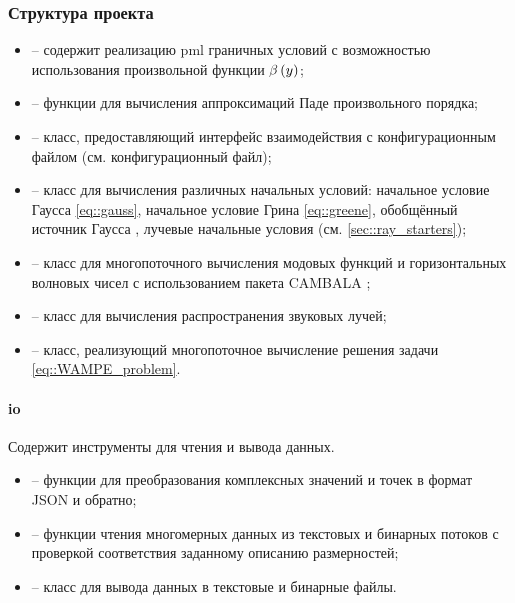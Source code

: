 \documentclass[../document.tex]{subfiles}
\begin{document}
            \subsubsection{Структура проекта}
                \begin{itemize}
                    \item{} -- содержит реализацию \acrshort{pml} граничных условий с возможностью использования произвольной функции $\beta\left(y\right)$;
                    \item{} -- функции для вычисления аппроксимаций Паде произвольного порядка;
                    \item{} -- класс, предоставляющий интерфейс взаимодействия с конфигурационным файлом (см. конфигурационный файл);
                    \item{} -- класс для вычисления различных начальных условий: начальное условие Гаусса \eqref{eq::gauss}, начальное условие Грина \eqref{eq::greene}, обобщённый источник Гаусса\parencite{jensen} \cite{jensen}, лучевые начальные условия (см. \ref{sec::ray_starters});
                    \item{} -- класс для многопоточного вычисления модовых функций и горизонтальных волновых чисел с использованием пакета CAMBALA \cite{cambala};
                    \item{} -- класс для вычисления распространения звуковых лучей;
                    \item{} -- класс, реализующий многопоточное вычисление решения задачи \eqref{eq::WAMPE_problem}.
                \end{itemize}
                \paragraph{io}
                    \par Содержит инструменты для чтения и вывода данных.
                    \begin{itemize}
                        \item{} -- функции для преобразования комплексных значений и точек в формат JSON и обратно;
                        \item{} -- функции чтения многомерных данных из текстовых и бинарных потоков с проверкой соответствия заданному описанию размерностей;
                        \item{} -- класс для вывода данных в текстовые и бинарные файлы.
                    \end{itemize}
\end{document}
